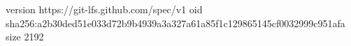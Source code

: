 version https://git-lfs.github.com/spec/v1
oid sha256:a2b30ded51e033d72b9b4939a3a327a61a85f1c129865145cf0032999c951afa
size 2192
